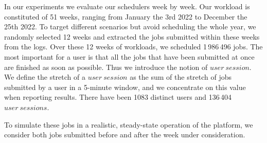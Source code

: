 \documentclass[conference]{IEEEtran}
\newcommand{\us}{\ensuremath{\mathit{user~session}}\xspace}
\newcommand{\uss}{\ensuremath{\mathit{user~sessions}}\xspace}
\begin{document}
In our experiments we evaluate our schedulers week by week.
Our workload is constituted of 51 weeks, ranging from January the 3rd 2022 to December the 25th 2022.
To target different scenarios but avoid scheduling the whole year, 
we randomly selected
12 weeks and
extracted the jobs submitted within these weeks from the logs. 
Over these 12 weeks of workloads, we scheduled 1\,986\,496 jobs. %
The most important for a user is that all the jobs that have been submitted at once are finished as soon as possible.
Thus we introduce the notion of \us.
We define the stretch of a \us as the sum of the stretch of jobs submitted by a user in a 5-minute window, and we concentrate on this value when reporting results.
There have been 1083 distinct users and 136\,404 \uss.

To simulate these jobs in a realistic, steady-state operation of the
platform, we consider both jobs submitted before and after the week
under consideration.
\end{document}
